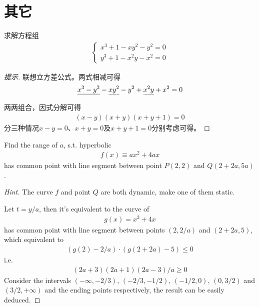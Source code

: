 


\section{其它}
\label{sec:misc-method}

\begin{example}[德国竞赛题]
  求解方程组
  \begin{align*}
    \begin{cases}
      x^3 + 1 - xy^2 - y^2 = 0\\
      y^3 + 1 - x^2y - x^2 = 0
    \end{cases}
  \end{align*}
\end{example}
\begin{proof}[提示]
  联想立方差公式。两式相减可得
  \begin{align*}
    \underline{x^3 - y^3} - \uwave{xy^2} - y^2 + \uwave{x^2y} + x^2 = 0
  \end{align*}
  两两组合，因式分解可得
  \begin{align*}
    (x-y)(x+y)(x+y+1)=0
  \end{align*}
  分三种情况$x-y=0$、$x+y=0$及$x+y+1=0$分别考虑可得。
\end{proof}


\begin{example}
  Find the range of $a$, s.t. hyperbolic
  \begin{align*}
    f(x)\equiv ax^2 + 4ax
  \end{align*}
  has common point with line segment between point $P(2,2)$ and $Q(2+2a, 5a)$.
\end{example}
\begin{proof}[Hint]
  The curve $f$ and point $Q$ are both dynamic, make one of them static.

  Let $t=y/a$, then it's equivalent to the curve of
  \begin{align*}
    g(x) = x^2 + 4x
  \end{align*}
  has common point with line segment between points $(2, 2/a)$ and $(2+2a, 5)$, which equivalent to
  \begin{align*}
    \left(g(2) - 2/a\right) \cdot \left( g(2+2a) - 5 \right) \le 0
  \end{align*}
  i.e.
  \begin{align*}
    (2a+3)(2a+1)(2a-3)/a \ge 0
  \end{align*}
  Consider the intervals $(-\infty, -2/3)$, $(-2/3, -1/2)$, $(-1/2, 0)$, $(0, 3/2)$ and $(3/2, +\infty)$ and the ending points respectively, the result can be easily deduced.
\end{proof}
